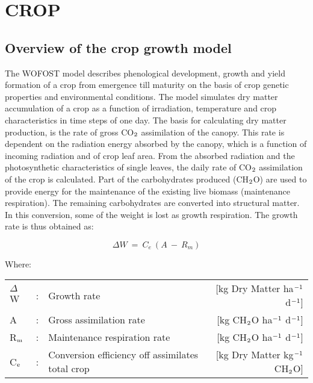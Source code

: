 \chapter{CROP}

\section{Overview of the crop growth model}

The WOFOST model describes phenological development, growth and yield forma\-tion of
a crop from emergence till maturity on the basis of crop genetic properties and environ\-mental conditions. The model simulates dry matter accumulation of a crop as a function
of irradiation, temperature and crop characteristics in time steps of one day. 
The basis for calculating dry matter production, is the rate of gross CO$_{{\rm 2}}$ assimilation of
the canopy. This rate is dependent on the radiation energy absorbed by the canopy, which
is a function of incoming radiation and of crop leaf area. From the absorbed radiation and
the photosynthetic characteristics of single leaves, the daily rate of CO$_{{\rm 2}}$ assimilation of the
crop is calculated. Part of the carbohydrates produced (CH$_{{\rm 2}}$O) are used to provide energy
for the maintenance of the existing live biomass (maintenance respiration). The remaining
carbohydrates are converted into structural matter. In this conversion, some of the weight
is lost as growth respir\-ation. The growth rate is thus obtained as:

\begin{equation}
\Delta W ~=~ C _{e} ~( A ~-~ R _{m} )
\end{equation}

 
Where:\\
\begin{tabularx}{\textwidth}{llXr}
$\Delta$W &:& Growth rate    &   [kg Dry Matter ha$^{{\rm -1}}$ d$^{{\rm -1}}$]\\
A  &:& Gross assimilation   rate &  [kg CH$_{{\rm 2}}$O ha$^{{\rm -1}}$ d$^{{\rm -1}}$]\\
R$_{{\rm m}}$  &:& Maintenance respiration rate    &  [kg CH$_{{\rm 2}}$O ha$^{{\rm -1}}$ d$^{{\rm -1}}$]\\
C$_{{\rm e}}$ &:& Conversion efficiency off assimilates total crop   &   [kg Dry Matter kg$^{{\rm -1}}$ CH$_{{\rm 2}}$O]\\
\end{tabularx}




